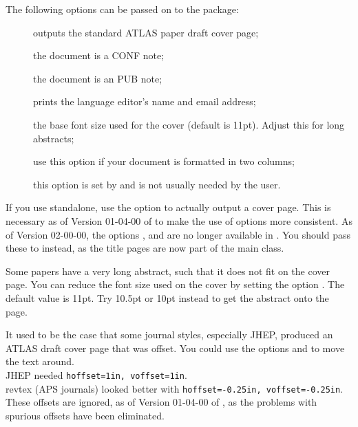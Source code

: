 The following options can be passed on to the  package:
\begin{description}
\item[] outputs the standard ATLAS paper draft cover page;
\item[] the document is a CONF note;
\item[] the document is an PUB note;
\item[] prints the language editor's name and email address;
\item[] the base font size used for the cover (default is 11pt). Adjust this for long abstracts;
\item[] use this option if your document is formatted in two columns;
\item[] this option is set by  and is not usually needed by the user.
\end{description}

If you use  standalone, use the option  to
actually output a cover page. 
This is necessary as of Version 01-04-00 of  to make the use of options more consistent.
As of Version 02-00-00, the options ,  and  are no longer available
in .
You should pass these to  instead, as the title pages are now part of the main class.

Some papers have a very long abstract, such that it does not fit on the cover page.
You can reduce the font size used on the cover by setting the option .
The default value is 11pt. Try 10.5pt or 10pt instead to get the abstract onto the page.

It used to be the case that some journal styles, especially JHEP,
produced an ATLAS draft cover page that was offset.
You could use the options  and  to move the text around.\\
JHEP needed \verb|hoffset=1in, voffset=1in|.\\
revtex (APS journals) looked better with  \verb|hoffset=-0.25in, voffset=-0.25in|.\\
These offsets are ignored, as of Version 01-04-00 of ,
as the problems with spurious offsets have been eliminated.

